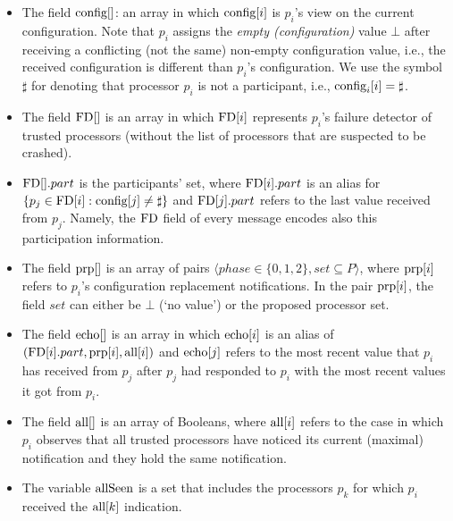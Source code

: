 \documentclass[11pt]{article}
\newcommand{\notif}{prp}
\begin{document}
\begin{itemize}

\item The field $\textnormal{config}[]$: an array in which $\textnormal{config}[i]$ is $p_i$'s view on the current configuration. Note that $p_i$ assigns the \emph{empty (configuration)} value $\bot$ after receiving a conflicting (not the same) non-empty configuration value, i.e., the received configuration is different than $p_i$'s configuration. We use the symbol $\sharp$ for denoting that processor $p_i$ is not a participant, i.e., $\textnormal{config}_i[i]=\sharp$.

\item The field $\textnormal{FD}[]$ is  an array in which $\textnormal{FD}[i]$ represents $p_i$'s failure detector of trusted processors (without the list of processors that are suspected to be crashed). 


\item $\textnormal{FD}[].part$ is the participants' set, where $\textnormal{FD}[i].part$ is an alias for $\{ p_j \in \textnormal{FD}[i] : \textnormal{config}[j] \neq \sharp \}$ and $\textnormal{FD}[j].part$ refers to the last value received from $p_j$. Namely, the $\textnormal{FD}$ field of every message encodes also this participation information.


\item The field $\textnormal{\notif}[]$ is an array of pairs $\langle phase \in \{0,1,2\}, set \subseteq P \rangle$, where $\textnormal{\notif}[i]$ refers to $p_i$'s configuration replacement notifications. In the pair $\textnormal{\notif}[i]$, the field $set$ can either be $\bot$ (`no value') or the proposed processor set. 

\item The field $\textnormal{echo}[]$ is an array in which $\textnormal{echo}[i]$ is an alias of  $(\textnormal{FD}[i].part, \textnormal{\notif}[i], \textnormal{all}[i])$ and $\textnormal{echo}[j]$ refers to the most recent value that $p_i$ has received from $p_j$ after $p_j$ had responded to $p_i$ with the most recent values it got from $p_i$.

\item The field $\textnormal{all}[]$ is an array of Booleans, where $\textnormal{all}[i]$ refers to the case in which $p_i$ observes that all trusted processors have noticed its current (maximal) notification and they hold the same notification. 


\item The variable $\textnormal{allSeen}$ is a set that includes the processors $p_k$ for which $p_i$ received the $\textnormal{all}[k]$ indication. 

\end{itemize}
\end{document}
